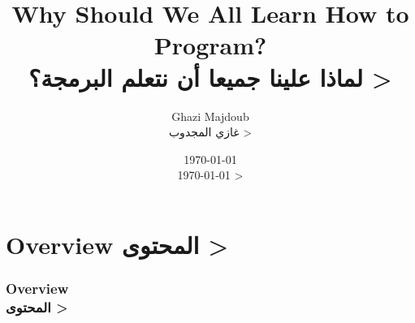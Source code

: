 \documentclass[9pt]{beamer}
\begin{document}

\title{		Why Should We All Learn How to Program?\\ 
			\<
			لماذا علينا جميعا أن نتعلم البرمجة؟
			>
} %
\author{	Ghazi Majdoub\\
			\< 
			غازي المجدوب
			>
}
\date{
			\today\\
			\<
			\today
			>
}

	\begin{frame}
		\titlepage
	\end{frame}
	
	\section*{
		Overview
		\<
		المحتوى
		>
	}
	\begin{frame}
		\frametitle{
			Overview\\
			\<
			المحتوى
			>
		}
		\tableofcontents
	\end{frame}
	
	
\end{document}
